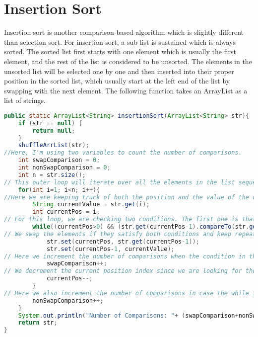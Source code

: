 \documentclass{article}
\begin{document}
\section{Insertion Sort}
Insertion sort is another comparison-based algorithm which is slightly different than selection sort. For insertion sort, a sub-list is sustained which is always sorted. The sorted list first starts with one element which is usually the first element, and the rest of the list is considered to be unsorted. The elements in the unsorted list will be selected one by one and then inserted into their proper position in the sorted list, which usually start at the left end of the list by swapping with the next element. The following function takes an ArrayList as a list of strings. 
\begin{lstlisting}[language=Java]
public static ArrayList<String> insertionSort(ArrayList<String> str){
    if (str == null) {
        return null;
    }
    shuffleArrList(str);
//Here, I'm using two variables to count the number of comparisons. 
    int swapComparison = 0;
    int nonSwapComparison = 0;
    int n = str.size();
// This outer loop will iterate over all the elements in the list sequentially starting from the second position, since a sub-list of one element is already sorted, all the way up to the last element. 
    for(int i=1; i<n; i++){
//Here we are keeping truck of both the position and the value of the current element we want to insert into its proper position, since we are swapping with other elements until we find its position.
        String currentValue = str.get(i);
        int currentPos = i;
// For this loop, we are checking two conditions. The first one is that we want to iterate over the all the elements in the list except the first one at indext 0, since we know that element is already in its sorted position. The second condition is where we compare the element at our current position with the element with its preceding element. 
        while((currentPos>0) && (str.get(currentPos-1).compareTo(str.get(currentPos))>0)){
// We swap the elements if they satisfy both conditions and keep repeating this process until we find it is proper position or we reach the last position at index 0.  
            str.set(currentPos, str.get(currentPos-1));
            str.set(currentPos-1, currentValue);
// Here we increment the number of comparisons when the condition in the while loop is true 
            swapComparison++;
// We decrement the current position index since we are looking for the correct position in the sorted sub-list , which is at the left side of the list. 
            currentPos--;
        }
// Here we also increment the number of comparisons in case the while is condition is false because we are doing comparisons in the while loop condition.
        nonSwapComparison++;
    }
    System.out.println("Number of Comparisons: "+ (swapComparison+nonSwapComparison));
    return str;
}
\end{lstlisting}
\end{document}
